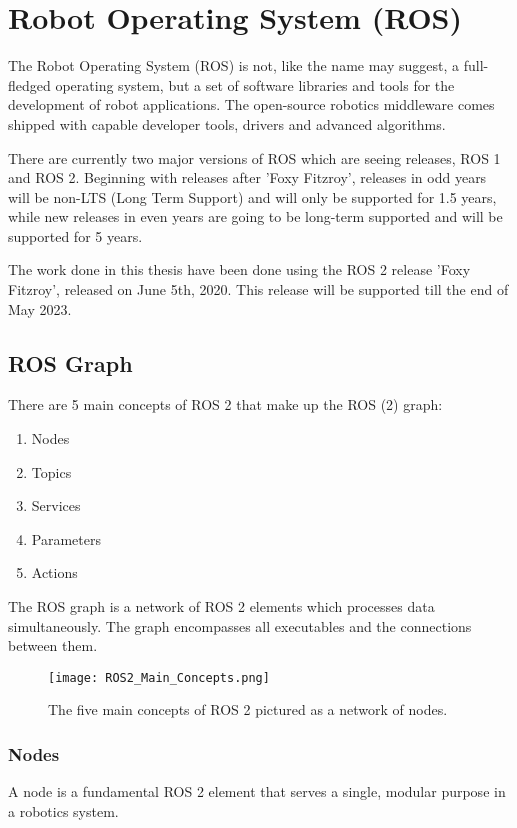 \section{Robot Operating System (ROS)}
The Robot Operating System (ROS) is not, like the name may suggest, a full-fledged operating system, but a set of software libraries and tools for the development of robot applications. The open-source robotics middleware comes shipped with capable developer tools, drivers and advanced algorithms. \cite{ros2_documentation}

There are currently two major versions of ROS which are seeing releases, ROS 1 and ROS 2. \cite{ros2_distributions} Beginning with releases after 'Foxy Fitzroy', releases in odd years will be non-LTS (Long Term Support) and will only be supported for 1.5 years, while new releases in even years are going to be long-term supported and will be supported for 5 years. \cite{ros2_releases_and_target_platforms}

The work done in this thesis have been done using the ROS 2 release 'Foxy Fitzroy', released on June 5th, 2020. This release will be supported till the end of May 2023. \cite{ros2_distributions}

\subsection{ROS Graph}
There are 5 main concepts of ROS 2 that make up the ROS (2) graph:
\begin{enumerate}
    \item Nodes
    \item Topics
    \item Services
    \item Parameters
    \item Actions
\end{enumerate}

The ROS graph is a network of ROS 2 elements which processes data simultaneously. The graph encompasses all executables and the connections between them.

\begin{figure}[H]
    \centering
    \texttt{[image: ROS2\_Main\_Concepts.png]}
    \caption{The five main concepts of ROS 2 pictured as a network of nodes.}
    \label{fig:ROS 2 main concepts}
\end{figure}

\subsubsection{Nodes}
A node is a fundamental ROS 2 element that serves a single, modular purpose in a robotics system. %

